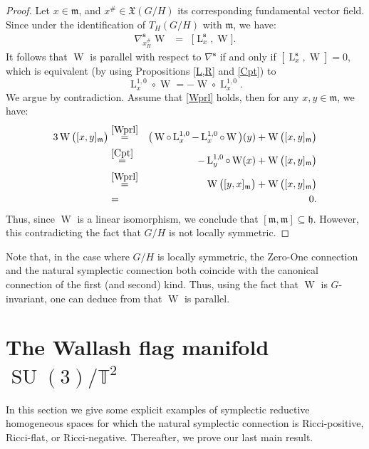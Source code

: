 \documentclass[preprint,12pt,1p]{elsarticle}
\theoremstyle{plain}
\theoremstyle{definition}
\newcommand{\ro}{\circ}
\newcommand{\vecf}{\mathfrak{X}}
\newcommand{\n}{\nabla}
\newcommand{\ns}{\n^\mathbf{s}}
\newcommand{\h}{\mathfrak{h}}
\newcommand{\m}{\mathfrak{m}}
\newcommand{\ls}{\operatorname{L}^\mathbf{s}}
\newcommand{\lm}{\operatorname{L}^{1,0}}
\newcommand{\F}{\operatorname{W}}
\numberwithin{equation}{section}
\newcommand{\SU}{\operatorname{SU}}
\begin{document}
\begin{proof}
Let $x\in\mathfrak{m}$, and $x^\#\in\vecf(G/H)$ its corresponding fundamental vector field. Since under the identification of $T_H(G/H)$ with $\mathfrak{m}$, we have:
\begin{eqnarray*}
\ns_{x^\#_H}\F&=&\big[\ls_x,\F\big].
\end{eqnarray*}
It follows that $\F$ is parallel with respect to $\ns$ if and only if $\left[\ls_x,\F\right]=0$, which is equivalent (by using Propositions \ref{L,R} and \ref{Cpt}) to
\begin{equation}\label{Wprl}
\lm_x\ro\F=-\F\ro\lm_x.
\end{equation}
We argue by contradiction. Assume that \eqref{Wprl} holds, then for any $x,y\in\mathfrak{m}$, we have:
\begin{eqnarray*}
3\F\big([x,y]_\mathfrak{m}\big)&\stackrel{\rm\eqref{Wprl}}{=}&\big(\F\ro\lm_x-\lm_x\ro\F\big)(y)+\F\big([x,y]_\mathfrak{m}\big)\\
&\stackrel{\rm\ref{Cpt}}{=}&-\lm_{y}\ro\F(x)+\F\big([x,y]_\mathfrak{m}\big)\\
&\stackrel{\rm\eqref{Wprl}}{=}&\F\big([y,x]_\mathfrak{m}\big)+\F\big([x,y]_\mathfrak{m}\big)\\
&=&0.
\end{eqnarray*}
Thus,  since $\F$ is a linear isomorphism, we conclude that $[\m,\m]\subseteq\h$. However, this contradicting the fact that $G/H$ is not locally symmetric.
\end{proof}

Note that, in the case where $G/H$ is locally symmetric, the Zero-One connection and the natural symplectic connection both coincide with the canonical connection of the first (and second) kind. Thus, using the fact that $\F$ is $G$-invariant, one can deduce from \cite[pp. 193-194]{Kob2} that $\F$ is parallel.

\section{The Wallash flag manifold $\SU(3)/\mathbb{T}^2$}

In this section we give some explicit examples of symplectic reductive homogeneous spaces for which the natural symplectic connection is Ricci-positive, Ricci-flat, or Ricci-negative. Thereafter, we prove our last main result.
\end{document}
